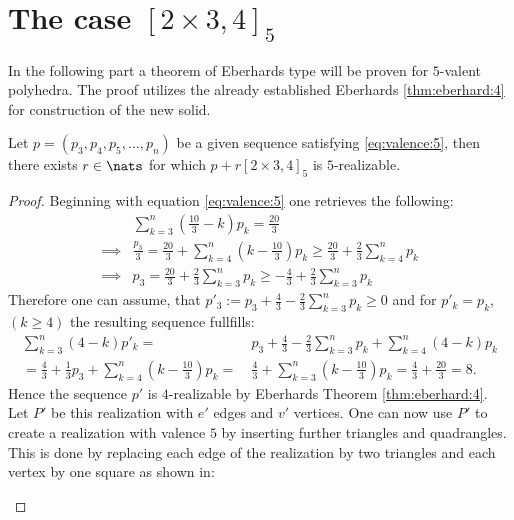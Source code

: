 \section{The case $[2 \times 3, 4]_5$}
In the following part a theorem of Eberhards type will be proven for $5$-valent polyhedra. The proof utilizes the already established Eberhards \autoref{thm:eberhard:4} for construction of the new solid.
\begin{theorem}
  Let $p = (p_3, p_4, p_5, \dots, p_n)$ be a given sequence satisfying \autoref{eq:valence:5}, then there exists $r \in \nats$ for which $p + r [2 \times 3, 4]_5$ is $5$-realizable.
  \begin{proof}
    Beginning with equation \autoref{eq:valence:5} one retrieves the following:
    \begin{align*}
      &\sum_{k=3}^n \left( \frac{10}{3} - k \right) p_k = \frac{20}{3} \\
      \implies & \frac{p_3}{3} = \frac{20}{3} + \sum_{k=4}^n \left(k - \frac{10}{3} \right) p_k \geq \frac{20}{3} + \frac{2}{3} \sum_{k=4}^n p_k \\
      \implies & p_3 = \frac{20}{3} + \frac{2}{3} \sum_{k=3}^n p_k \geq - \frac{4}{3} + \frac{2}{3} \sum_{k=3}^n p_k
    \end{align*}
    Therefore one can assume, that $p'_3 := p_3 + \frac{4}{3} - \frac{2}{3} \sum_{k=3}^n p_k \geq 0$ and for $p'_k = p_k$, $(k\geq 4)$ the resulting sequence fullfills:
   \begin{align*}
     \sum_{k=3}^n (4 - k) p'_k =&~ p_3 + \frac{4}{3} - \frac{2}{3} \sum_{k=3}^n p_k + \sum_{k=4}^n (4 - k) p_k \\
     = \frac{4}{3} + \frac{1}{3} p_3 + \sum_{k=4}^n \left(k - \frac{10}{3} \right) p_k =&~ \frac{4}{3} + \sum_{k=3}^n \left(k - \frac{10}{3} \right) p_k = \frac{4}{3} + \frac{20}{3} = 8.
   \end{align*}
   Hence the sequence $p'$ is $4$-realizable by Eberhards Theorem \autoref{thm:eberhard:4}. Let $P'$ be this realization with $e'$ edges and $v'$ vertices. One can now use $P'$ to create a realization with valence $5$ by inserting further triangles and quadrangles. This is done by replacing each edge of the realization by two triangles and each vertex by one square as shown in:

   \begin{figure}[hptt]\centering
\end{figure}
\end{proof}
\end{theorem}

